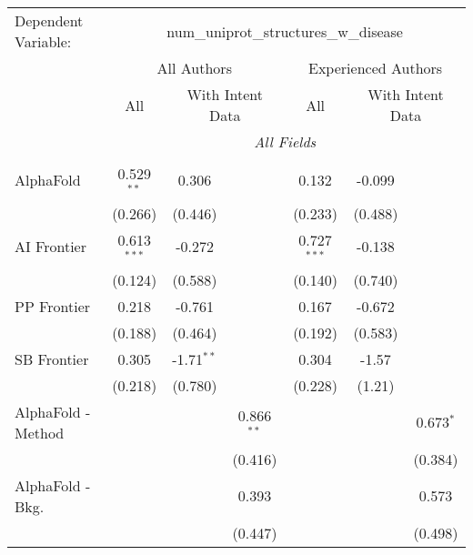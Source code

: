 \begingroup
\centering
\begin{tabular}{lcccccc}
   \tabularnewline \midrule \midrule
   Dependent Variable: & \multicolumn{6}{c}{num\_uniprot\_structures\_w\_disease}\\
 & \multicolumn{3}{c}{All Authors} & \multicolumn{3}{c}{Experienced Authors} \\
\cmidrule(lr){2-4} \cmidrule(lr){5-7}
 & \multicolumn{1}{c}{All} & \multicolumn{2}{c}{With Intent Data} & \multicolumn{1}{c}{All} & \multicolumn{2}{c}{With Intent Data} \\
\cmidrule(lr){2-2} \cmidrule(lr){3-4} \cmidrule(lr){5-5} \cmidrule(lr){6-7}
 & \multicolumn{6}{c}{\textit{All Fields}} \\ \\
   AlphaFold                   & 0.529$^{**}$  & 0.306        &              & 0.132         & -0.099  &   \\   
                               & (0.266)       & (0.446)      &              & (0.233)       & (0.488) &   \\   
   AI Frontier                 & 0.613$^{***}$ & -0.272       &              & 0.727$^{***}$ & -0.138  &   \\   
                               & (0.124)       & (0.588)      &              & (0.140)       & (0.740) &   \\   
   PP Frontier                 & 0.218         & -0.761       &              & 0.167         & -0.672  &   \\   
                               & (0.188)       & (0.464)      &              & (0.192)       & (0.583) &   \\   
   SB Frontier                 & 0.305         & -1.71$^{**}$ &              & 0.304         & -1.57   &   \\   
                               & (0.218)       & (0.780)      &              & (0.228)       & (1.21)  &   \\   
   AlphaFold - Method          &               &              & 0.866$^{**}$ &               &         & 0.673$^{*}$\\   
                               &               &              & (0.416)      &               &         & (0.384)\\   
   AlphaFold - Bkg.            &               &              & 0.393        &               &         & 0.573\\   
                               &               &              & (0.447)      &               &         & (0.498)\\   

\end{tabular}
